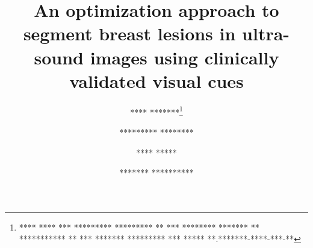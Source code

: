 \title{ An optimization approach to segment breast lesions in ultra-sound images using clinically validated visual cues }
%
\author{
  **** *******\thanks{**** **** *** ********* ********* ** *** ******** 
                      ******* ** *********** ** *** ******* ********* *** 
                      ***** **.*******-****-***-**} 
  \and ********* ********
  \and **** *****
  \and ******* **********
}
%
%
%
